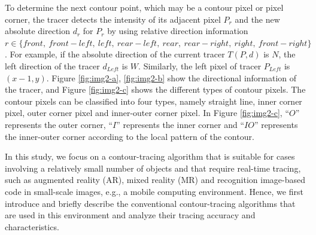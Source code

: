 \documentclass[sensors,article,accept,moreauthors,pdftex,10pt,a4paper]{mdpi}
\begin{document}

To determine the next contour point, which may be a contour pixel or pixel corner, the tracer detects the intensity of its adjacent pixel $P_r$ and the new absolute direction $d_r$ for $P_r$ by using relative direction information $r\in\{front,\ front-left,\ left,\ rear-left,\ rear,\ rear-right,\ right,\ front-right\}$. For example, if the absolute direction of the current tracer $T(P, d)$ is $N$, the left direction of the tracer $d_{Left}$ is $W$. Similarly, the left pixel of tracer $P_{Left}$ is $(x - 1, y)$. Figure \ref{fig:img2-a}, \ref{fig:img2-b} show the directional information of the tracer, and Figure \ref{fig:img2-c} shows the different types of contour pixels. The contour pixels can be classified into four types, namely straight line, inner corner pixel, outer corner pixel and inner-outer corner pixel. In Figure \ref{fig:img2-c}, ``$O$'' represents the outer corner, ``$I$'' represents the inner corner and ``$IO$'' represents the inner-outer corner according to the local pattern of the contour.


In this study, we focus on a contour-tracing algorithm that is suitable for cases involving a relatively small number of objects and that require real-time tracing, such as augmented reality (AR), mixed reality (MR) and recognition image-based code in small-scale images, e.g., a mobile computing environment. Hence, we first introduce and briefly describe the conventional contour-tracing algorithms that are used in this environment and analyze their tracing accuracy and characteristics. 
\end{document}
